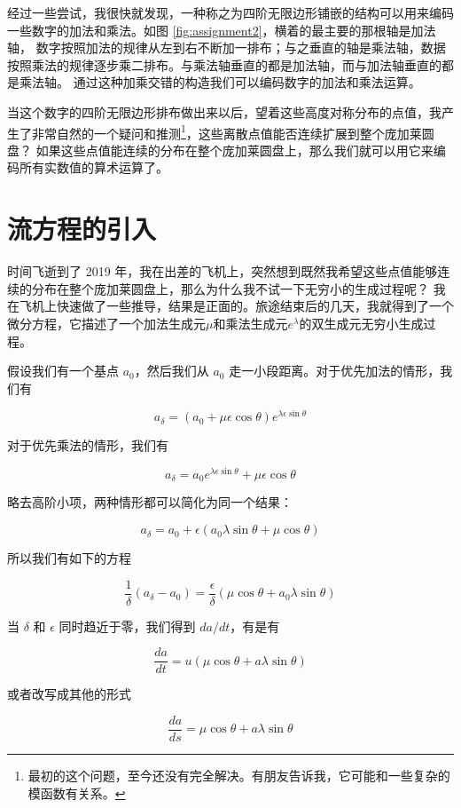 \documentclass[a4paper,12pt]{book}
\numberwithin{problem}{section}
\numberwithin{definition}{section}
\numberwithin{lemma}{section}
\numberwithin{proposition}{section}
\numberwithin{theorem}{section}
\numberwithin{grammar}{section}
\numberwithin{program}{section}
\numberwithin{convention}{section}
\numberwithin{corollary}{section}
\begin{document}
经过一些尝试，我很快就发现，一种称之为四阶无限边形铺嵌的结构可以用来编码一些数字的加法和乘法。如图 \ref{fig:assignment2}，横着的最主要的那根轴是加法轴，
数字按照加法的规律从左到右不断加一排布；与之垂直的轴是乘法轴，数据按照乘法的规律逐步乘二排布。与乘法轴垂直的都是加法轴，而与加法轴垂直的都是乘法轴。
通过这种加乘交错的构造我们可以编码数字的加法和乘法运算。

当这个数字的四阶无限边形排布做出来以后，望着这些高度对称分布的点值，我产生了非常自然的一个疑问和推测\footnote{最初的这个问题，至今还没有完全解决。有朋友告诉我，它可能和一些复杂的模函数有关系。}，这些离散点值能否连续扩展到整个庞加莱圆盘？
如果这些点值能连续的分布在整个庞加莱圆盘上，那么我们就可以用它来编码所有实数值的算术运算了。

\section{流方程的引入}

时间飞逝到了 2019 年，我在出差的飞机上，突然想到既然我希望这些点值能够连续的分布在整个庞加莱圆盘上，那么为什么我不试一下无穷小的生成过程呢？
我在飞机上快速做了一些推导，结果是正面的。旅途结束后的几天，我就得到了一个微分方程，它描述了一个加法生成元$\mu$和乘法生成元$e^\lambda$的双生成元无穷小生成过程。

假设我们有一个基点 $a_0$，然后我们从 $a_0$ 走一小段距离。对于优先加法的情形，我们有

\[
a_{\delta} = (a_0 + \mu \epsilon \cos \theta)e^{\lambda \epsilon \sin \theta}
\]

对于优先乘法的情形，我们有

\[
a_{\delta} = a_0 e^{\lambda \epsilon \sin \theta} + \mu \epsilon \cos \theta
\]

略去高阶小项，两种情形都可以简化为同一个结果：

\[
a_{\delta} = a_0 + \epsilon (a_0 \lambda \sin \theta + \mu \cos \theta)
\]

所以我们有如下的方程

\[
\frac{1}{\delta} (a_{\delta} - a_0) = \frac{\epsilon}{\delta} (\mu \cos \theta + a_0 \lambda \sin \theta)
\]

当 $\delta$ 和 $\epsilon$ 同时趋近于零，我们得到 $da / dt$，有是有

\[
\frac{da}{dt} = u (\mu \cos \theta + a \lambda \sin \theta)
\]

或者改写成其他的形式

\begin{equation}
\frac{da}{ds} = \mu \cos \theta + a \lambda \sin \theta\label{eq:flow}
\end{equation}
\end{document}
